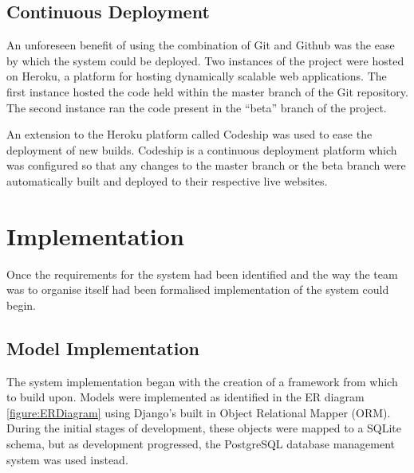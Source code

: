 \documentclass[a4paper]{l3proj}
\begin{document}
\section{Continuous Deployment}
\label{deployment}

An unforeseen benefit of using the combination of Git and Github was the ease by which the system could be deployed. Two instances of the project were hosted on Heroku, a platform for hosting dynamically scalable web applications. The first instance hosted the code held within the master branch of the Git repository. The second instance ran the code present in the “beta” branch of the project.

An extension to the Heroku platform called Codeship was used to ease the deployment of new builds. Codeship is a continuous deployment platform which was configured so that any changes to the master branch or the beta branch were automatically built and deployed to their respective live websites.


\chapter{Implementation}
\label{impl}

Once the requirements for the system had been identified and the way the team was to organise itself had been formalised implementation of the system could begin.


\section{Model Implementation}
\label{modelImpl}

The system implementation began with the creation of a framework from which to build upon.  Models were implemented as identified in the ER diagram \autoref{figure:ERDiagram} using Django’s built in Object Relational Mapper (ORM). During the initial stages of development, these objects were mapped to a SQLite schema, but as development progressed, the PostgreSQL database management system was used instead.
\end{document}
